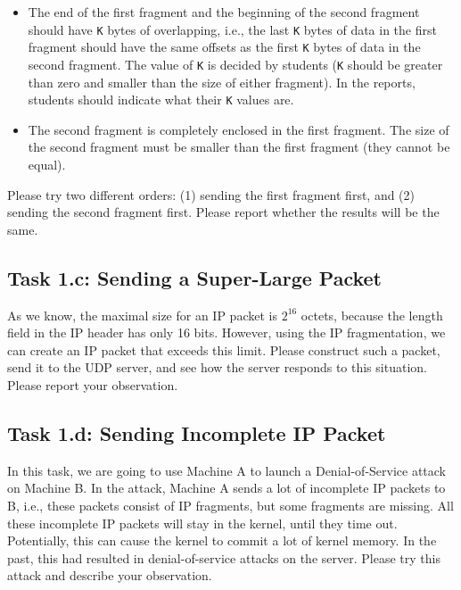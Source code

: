  \begin{itemize} 
 \item The end of the first fragment and the beginning of the second
 fragment should have \texttt{K} bytes of overlapping, i.e., the last  
 \texttt{K} bytes of data in the first fragment should have the same
 offsets as the first \texttt{K} bytes of data in the second fragment. 
 The value of \texttt{K} is decided by students (\texttt{K} should be 
 greater than zero and smaller than the size of either fragment). In the reports, students
 should indicate what their \texttt{K} values are. 


 \item The second fragment is completely enclosed in the first fragment.
 The size of the second fragment must be smaller than the 
 first fragment (they cannot be equal).

 \end{itemize} 


Please try two different orders: (1) sending the first fragment first, and 
(2) sending the second fragment first. Please report whether the results will
be the same. 





\subsection{Task 1.c: Sending a Super-Large Packet}

As we know, the maximal size for an IP packet is $2^{16}$ octets, because
the length field in the IP header has only 16 bits. 
However,
using the IP fragmentation, we can create an IP packet that 
exceeds this limit. Please construct such a packet, send
it to the UDP server, and see how the server responds to this 
situation. Please report your observation. 
  



\subsection{Task 1.d: Sending Incomplete IP Packet}


In this task, we are going to use Machine A to launch a Denial-of-Service attack 
on Machine B. In the attack, Machine A sends  a lot of 
incomplete IP packets to B, i.e., these packets consist of 
IP fragments, but some fragments are missing. All these incomplete IP packets 
will stay in the kernel, until they time out. Potentially, this can
cause the kernel to commit a lot of kernel memory. In the past, this 
had resulted in denial-of-service attacks on the server. Please try 
this attack and describe your observation. 




